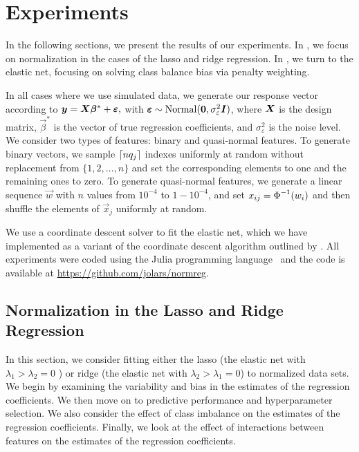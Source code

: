 \section{Experiments}\label{sec:experiments}

In the following sections, we present the results of our experiments. In
, we focus on normalization in the cases of the lasso and
ridge regression. In , we turn to the elastic net,
focusing on solving class balance bias via penalty weighting.

In all cases where we use simulated data, we generate our response vector according to
\(\boldsymbol{y} = \boldsymbol{X}\boldsymbol{\beta}^* + \boldsymbol{\varepsilon},\) with \(\boldsymbol{\varepsilon} \sim
\operatorname{Normal}(\boldsymbol{0}, \sigma_\varepsilon^2 \boldsymbol{I})\), where \(\boldsymbol{X}\) is the design matrix,
\(\vec{\beta}^*\) is the vector of true regression coefficients, and
\(\sigma_\varepsilon^2\) is the noise level. We consider two types of features: binary and
quasi-normal features. To generate binary vectors, we sample \(\lceil nq_j \rceil\) indexes
uniformly at random without replacement from \(\{1,2,\dots,n\}\) and set the corresponding
elements to one and the remaining ones to zero. To generate quasi-normal features, we
generate a linear sequence \(\vec{w}\) with \(n\) values from \(10^{-4}\) to \(1 -
10^{-4}\), and set \(x_{ij} = \operatorname{\Phi}^{-1}(w_i)\) and then shuffle the elements of
\(\vec{x}_j\) uniformly at random.

We use a coordinate descent solver to fit the elastic net, which we have implemented as a
variant of the coordinate descent algorithm outlined by \citet{friedman2010}. All
experiments were coded using the Julia programming language~\citep{bezanson2017} and the
code is available at \url{https://github.com/jolars/normreg}.

\subsection{Normalization in the Lasso and Ridge Regression}\label{sec:experiments-lassoridge}

In this section, we consider fitting either the lasso (the elastic net with \(\lambda_1 >
\lambda_2 = 0\) ) or ridge (the elastic net with \(\lambda_2 > \lambda_1 = 0\)) to
normalized data sets. We begin by examining the variability and bias in the estimates of
the regression coefficients. We then move on to predictive performance and hyperparameter
selection. We also consider the effect of class imbalance on the estimates of the
regression coefficients. Finally, we look at the effect of interactions between features on
the estimates of the regression coefficients.

